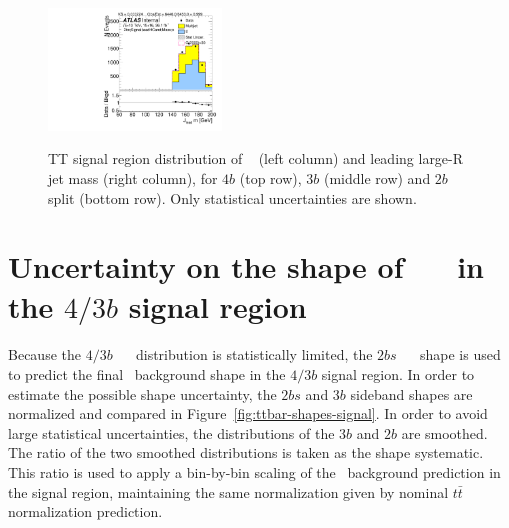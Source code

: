 \begin{figure}[htb!]
\begin{center}
\includegraphics[width=0.41\textwidth,angle=-90]{figures/boosted/TT/Moriond_TT_TwoTag_split_Signal_leadHCand_Mass_s.pdf}\\
\end{center}
\caption{TT signal region distribution of \mtwoJ~ (left column) and leading large-R jet mass (right column), for $4b$ (top row), $3b$ (middle row) and $2b$ split (bottom row). Only statistical uncertainties are shown.}
\label{CRSB:TTSR_Distribution}
\end{figure}


\clearpage
\section{Uncertainty on the shape of \ttbar\ \mtwoJ~ in the $4/3b$ signal region}
\label{sec:unc-shape-ttbar-in-sr}

\paragraph{}
Because the $4/3b$ \ttbar\ \mtwoJ~ distribution is statistically limited, the $2bs$ \ttbar\ \mtwoJ~ shape is used to predict the final \ttbar\ background shape in the $4/3b$ signal region.
In order to estimate the possible shape uncertainty, the $2bs$ and $3b$ sideband shapes are normalized and compared in Figure~\ref{fig:ttbar-shapes-signal}.  
In order to avoid large statistical uncertainties, the distributions of the $3b$ and $2b$ are smoothed. 
The ratio of the two smoothed distributions is taken as the shape systematic. 
This ratio is used to apply a bin-by-bin scaling of the \ttbar\ background prediction in the signal region, maintaining the same normalization given by nominal $t\bar{t}$ normalization prediction.

